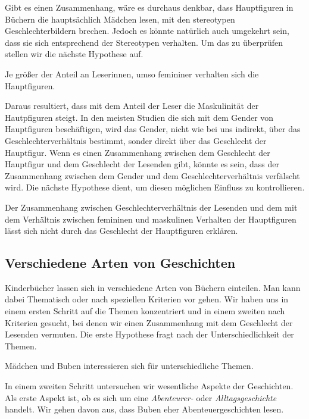 Gibt es einen Zusammenhang, wäre es durchaus denkbar, dass Hauptfiguren
in Büchern die hauptsächlich Mädchen lesen, mit den stereotypen
Geschlechterbildern brechen. Jedoch es könnte natürlich auch umgekehrt
sein, dass sie sich entsprechend der Stereotypen verhalten. Um das zu
überprüfen stellen wir die nächste Hypothese auf.

\begin{subhyp}\label{h3.1}
    Je größer der Anteil an Leserinnen, umso femininer verhalten sich die Hauptfiguren.
\end{subhyp}

Daraus resultiert, dass mit dem Anteil der Leser die Maskulinität der
Hautpfiguren steigt. In den meisten Studien die sich mit dem Gender von
Hauptfiguren beschäftigen, wird das Gender, nicht wie bei uns indirekt,
über das Geschlechterverhältnis bestimmt, sonder direkt über das
Geschlecht der Hauptfigur. Wenn es einen Zusammenhang zwischen dem
Geschlecht der Hauptfigur und dem Geschlecht der Lesenden gibt, könnte
es sein, dass der Zusammenhang zwischen dem Gender und dem
Geschlechterverhältnis verfälscht wird. Die nächste Hypothese dient, um
diesen möglichen Einfluss zu kontrollieren.

\begin{subhyp}\label{h3.2}
    Der Zusammenhang zwischen Geschlechterverhältnis der Lesenden und dem
    mit dem Verhältnis zwischen femininen und maskulinen Verhalten der Hauptfiguren lässt sich nicht durch das Geschlecht der Hauptfiguren erklären.
\end{subhyp}

\subsection{Verschiedene Arten von Geschichten}

Kinderbücher lassen sich in verschiedene Arten von Büchern einteilen.
Man kann dabei Thematisch oder nach speziellen Kriterien vor gehen. Wir
haben uns in einem ersten Schritt auf die Themen konzentriert und in
einem zweiten nach Kriterien gesucht, bei denen wir einen Zusammenhang
mit dem Geschlecht der Lesenden vermuten. Die erste Hypothese fragt nach
der Unterschiedlichkeit der Themen.

\begin{hyp}\label{hyp:themen}
    Mädchen und Buben interessieren sich für unterschiedliche Themen.
\end{hyp}

In einem zweiten Schritt untersuchen wir wesentliche Aspekte der
Geschichten. Als erste Aspekt ist, ob es sich um eine \emph{Abenteurer-}
oder \emph{Alltagsgeschichte} handelt. Wir gehen davon aus, dass Buben
eher Abenteuergeschichten lesen.

